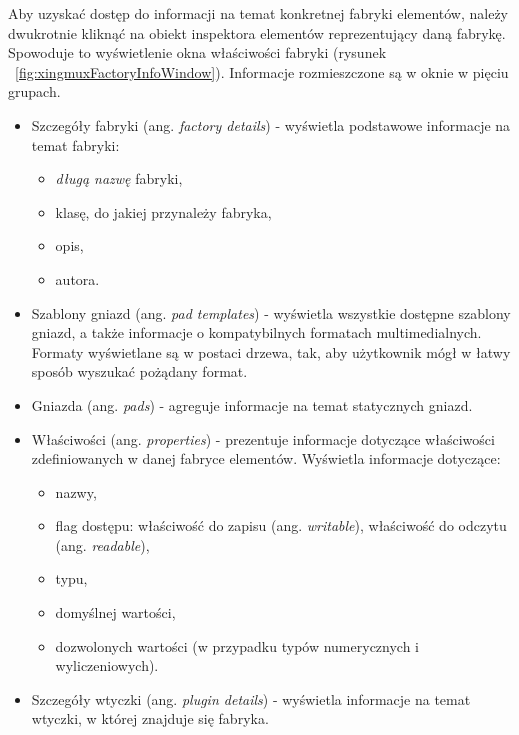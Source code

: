 \documentclass[12pt]{article}
\begin{document}
\noindent
Aby uzyskać dostęp do informacji na temat konkretnej fabryki elementów, należy dwukrotnie kliknąć na obiekt inspektora elementów reprezentujący daną fabrykę. Spowoduje to wyświetlenie okna właściwości fabryki (rysunek ~\ref{fig:xingmuxFactoryInfoWindow}). Informacje rozmieszczone są w oknie w pięciu grupach.
\begin{itemize}
  \setlength{\itemsep}{0em}
\item Szczegóły fabryki (ang. \textit{factory details}) - wyświetla podstawowe informacje na temat fabryki:
  \begin{itemize}
    \setlength{\itemsep}{0em}
  \item \textit{długą nazwę} fabryki,
  \item klasę, do jakiej przynależy fabryka,
  \item opis,
  \item autora.
  \end{itemize}
\item Szablony gniazd (ang. \textit{pad templates}) - wyświetla wszystkie dostępne szablony gniazd, a także informacje o kompatybilnych formatach multimedialnych. Formaty wyświetlane są w postaci drzewa, tak, aby użytkownik mógł w łatwy sposób wyszukać pożądany format.
\item Gniazda (ang. \textit{pads}) - agreguje informacje na temat statycznych gniazd.
\item Właściwości (ang. \textit{properties}) - prezentuje informacje dotyczące właściwości zdefiniowanych w danej fabryce elementów. Wyświetla informacje dotyczące:
  \begin{itemize}
    \setlength{\itemsep}{0em}
  \item nazwy,
  \item flag dostępu: właściwość do zapisu (ang. \textit{writable}), właściwość do odczytu (ang. \textit{readable}),
  \item typu,
  \item domyślnej wartości,
  \item dozwolonych wartości (w przypadku typów numerycznych i wyliczeniowych).
  \end{itemize}
\item Szczegóły wtyczki (ang. \textit{plugin details}) - wyświetla informacje na temat wtyczki, w której znajduje się fabryka.
\end{itemize}
\end{document}
